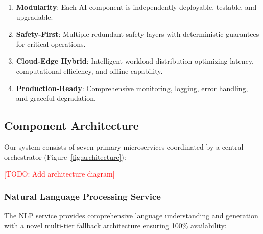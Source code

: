 \documentclass[conference]{IEEEtran}
\newcommand{\todo}[1]{\textcolor{red}{[TODO: #1]}}
\begin{document}
\begin{enumerate}
    \item \textbf{Modularity}: Each AI component is independently deployable, testable, and upgradable.
    \item \textbf{Safety-First}: Multiple redundant safety layers with deterministic guarantees for critical operations.
    \item \textbf{Cloud-Edge Hybrid}: Intelligent workload distribution optimizing latency, computational efficiency, and offline capability.
    \item \textbf{Production-Ready}: Comprehensive monitoring, logging, error handling, and graceful degradation.
\end{enumerate}

\subsection{Component Architecture}

Our system consists of seven primary microservices coordinated by a central orchestrator (Figure~\ref{fig:architecture}):

\todo{Add architecture diagram}

\subsubsection{Natural Language Processing Service}

The NLP service provides comprehensive language understanding and generation with a novel multi-tier fallback architecture ensuring 100\% availability:
\end{document}
